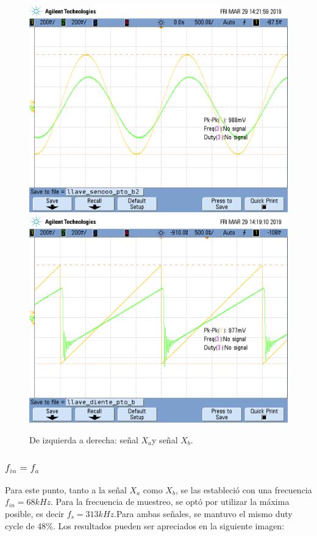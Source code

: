 \documentclass[../../ASSD_TP1_G7.tex]{subfiles}
\begin{document}
\begin{figure}[H]

\centering{}\includegraphics[scale=0.25]{Imagenes/llave_senooo_pto_b2}\includegraphics[scale=0.25]{Imagenes/llave_diente_pto_b}\caption{De izquierda a derecha: señal $X_{a}$y señal $X_{b}$.}
\end{figure}


\subsubsection{$f_{in}=f_{a}$}

Para este punto, tanto a la señal $X_{a}$ como $X_{b}$, se las estableció
con una frecuencia $f_{in}=68kHz$. Para la frecuencia de muestreo,
se optó por utilizar la máxima posible, es decir $f_{s}=313kHz.$Para
ambas señales, se mantuvo el mismo duty cycle de 48\%. Los resultados
pueden ser apreciados en la siguiente imagen:
\end{document}
